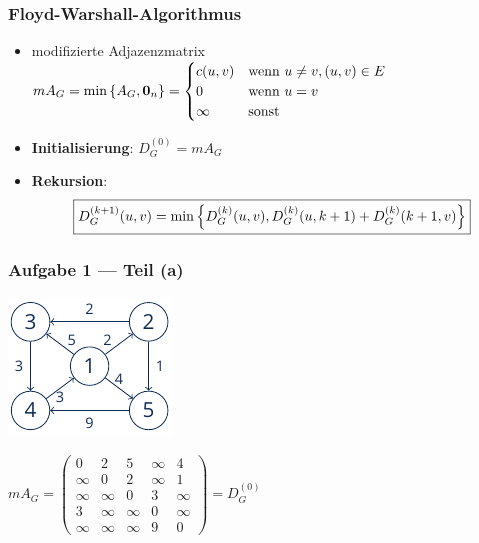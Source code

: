 \documentclass{beamer}
\begin{document}
\begin{frame} \frametitle{Floyd-Warshall-Algorithmus}
	\begin{itemize}
		\item modifizierte Adjazenzmatrix $mA_G = \min\left\{ A_G, \mathbf{0}_n \right\} = \begin{cases}
		c(u,v) & \text{wenn } u \neq v, (u,v) \in E \\
		0 & \text{wenn } u = v \\
		\infty & \text{sonst}
		\end{cases}$
		\item \textbf{Initialisierung}: $D_G^{(0)} = mA_G$
		\item \textbf{Rekursion}:
		\begin{equation*}
		\boxed{D_G^{(k+1)}(u,v) = \min\left\{ D_G^{(k)}(u,v) , D_G^{(k)}(u,k+1) + D_G^{(k)}(k+1,v) \right\}}
		\end{equation*}
	\end{itemize}
\end{frame}

\begin{frame} \frametitle{Aufgabe 1 --- Teil (a)}
	\begin{minipage}{\dimexpr0.4\linewidth-\fboxrule-\fboxsep}
		\includegraphics[width=\linewidth]{./tut12_task1-graph.pdf}
	\end{minipage}
	\pause
	\begin{minipage}{\dimexpr0.6\linewidth-\fboxrule-\fboxsep}
		$mA_G = \begin{pmatrix}
		0      & 2      & 5      & \infty & 4 \\
		\infty & 0      & 2      & \infty & 1 \\
		\infty & \infty & 0      & 3      & \infty \\
		3      & \infty & \infty & 0      & \infty \\
		\infty & \infty & \infty & 9      & 0
		\end{pmatrix} = D_G^{(0)}$
	\end{minipage}
\end{frame}
\end{document}
